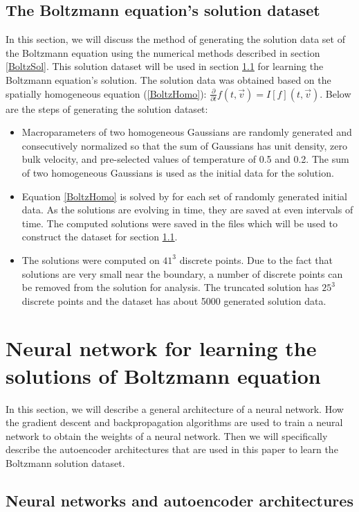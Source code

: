 \documentclass{article}
\begin{document}
\subsection{The Boltzmann equation's solution dataset}
In this section, we will discuss the method of generating the solution data set of the Boltzmann equation using the numerical methods described in section \ref{BoltzSol}. This solution dataset will be used in section \ref{NN} for learning the Boltzmann equation's solution. The solution data was obtained based on the spatially homogeneous equation (\ref{BoltzHomo}): $\frac{\partial}{\partial t}f(t,\vec{v}) = I[f](t, \vec{v})$. Below are the steps of generating the solution dataset:
\begin{itemize}
\item Macroparameters of two homogeneous Gaussians are randomly generated and consecutively normalized so that the sum of Gaussians has unit density, zero bulk velocity, and pre-selected values of temperature of 0.5 and 0.2. The sum of two homogeneous Gaussians is used as the initial data for the solution.
\item Equation \ref{BoltzHomo} is solved by \cite{Alekseenko4} for each set of randomly generated initial data. As the solutions are evolving in time, they are saved at even intervals of time. The computed solutions were saved in the files which will be used to construct the dataset for section \ref{NN}.
\item The solutions were computed on $41^3$ discrete points. Due to the fact that solutions are very small near the boundary, a number of discrete points can be removed from the solution for analysis. The truncated solution has $25^3$ discrete points and the dataset has about 5000  generated solution data.
 
\end{itemize}

\section{Neural network for learning the solutions of Boltzmann equation} \label{NN}
In this section, we will describe a general architecture of a neural network. How the gradient descent and backpropagation algorithms are used to train a neural network to obtain the weights of a neural network. Then we will specifically describe the autoencoder architectures that are used in this paper to learn the Boltzmann solution dataset.
\subsection{Neural networks and autoencoder architectures} \label{NN}
\end{document}
